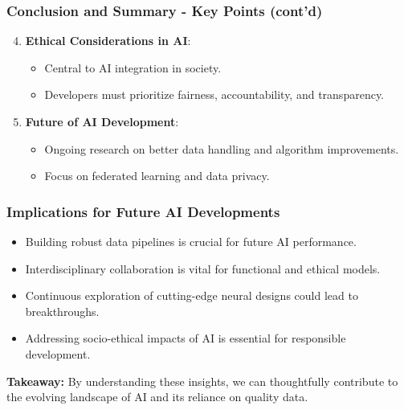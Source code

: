 \documentclass[aspectratio=169]{beamer}
\begin{document}
\begin{frame}[fragile]
    \frametitle{Conclusion and Summary - Key Points (cont'd)}
    \begin{enumerate}
        \setcounter{enumi}{3}
        \item \textbf{Ethical Considerations in AI}:
        \begin{itemize}
            \item Central to AI integration in society.
            \item Developers must prioritize fairness, accountability, and transparency.
        \end{itemize}
        
        \item \textbf{Future of AI Development}:
        \begin{itemize}
            \item Ongoing research on better data handling and algorithm improvements.
            \item Focus on federated learning and data privacy.
        \end{itemize}
    \end{enumerate}
\end{frame}

\begin{frame}[fragile]
    \frametitle{Implications for Future AI Developments}
    \begin{itemize}
        \item Building robust data pipelines is crucial for future AI performance.
        \item Interdisciplinary collaboration is vital for functional and ethical models.
        \item Continuous exploration of cutting-edge neural designs could lead to breakthroughs.
        \item Addressing socio-ethical impacts of AI is essential for responsible development.
    \end{itemize}
    
    \textbf{Takeaway:} By understanding these insights, we can thoughtfully contribute to the evolving landscape of AI and its reliance on quality data.
\end{frame}
\end{document}
